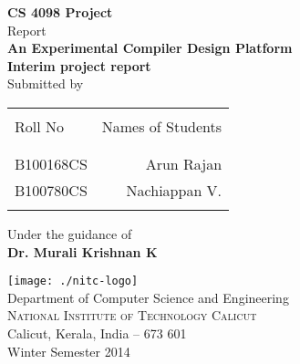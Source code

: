 \begin{titlepage}

\begin{center}

\textup{\small {\bf CS 4098 Project} \\ Report}\\[0.2in]

\Large \textbf {An Experimental Compiler Design Platform}\\[0.5in]

       

       {\bf Interim project report}\\[0.5in]

\normalsize Submitted by \\
\begin{table}[h]
\centering
\begin{tabular}{lr}\hline \\
Roll No & Names of Students \\ \\ \hline
\\
B100168CS & Arun Rajan \\
B100780CS & Nachiappan V. \\ \\ \hline 
\end{tabular}
\end{table}

\vspace{.1in}
Under the guidance of\\
{\textbf{Dr. Murali Krishnan K}}\\[0.2in]

\vfill

\texttt{[image: ./nitc-logo]}\\[0.1in]
\Large{Department of Computer Science and Engineering}\\
\normalsize
\textsc{National Institute of Technology Calicut}\\
Calicut, Kerala, India -- 673 601 \\
\vspace{0.2cm}
Winter Semester 2014

\end{center}

\end{titlepage}
